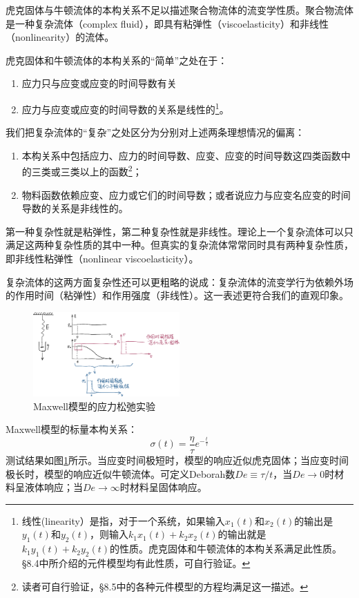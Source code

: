 \documentclass[main.tex]{subfiles}
\begin{document}
虎克固体与牛顿流体的本构关系不足以描述聚合物流体的流变学性质。聚合物流体是一种复杂流体（complex fluid），即具有粘弹性（viscoelasticity）和非线性（nonlinearity）的流体。

虎克固体和牛顿流体的本构关系的“简单”之处在于：
\begin{enumerate}
    \item 应力只与应变或应变的时间导数有关
    \item 应力与应变或应变的时间导数的关系是线性的\footnote{线性(linearity）是指，对于一个系统，如果输入\(x_1\left(t\right)\)和\(x_2\left(t\right)\)的输出是\(y_1\left(t\right)\)和\(y_2\left(t\right)\)，则输入\(k_1x_1\left(t\right)+k_2x_2\left(t\right)\)的输出就是\(k_1y_1\left(t\right)+k_2y_2\left(t\right)\)的性质。虎克固体和牛顿流体的本构关系满足此性质。\S 8.4中所介绍的元件模型均有此性质，可自行验证。}。
\end{enumerate}
我们把复杂流体的“复杂”之处区分为分别对上述两条理想情况的偏离：
\begin{enumerate}
    \item 本构关系中包括应力、应力的时间导数、应变、应变的时间导数这四类函数中的三类或三类以上的函数\footnote{读者可自行验证，\S 8.5中的各种元件模型的方程均满足这一描述。}；
    \item 物料函数依赖应变、应力或它们的时间导数；或者说应力与应变名应变的时间导数的关系是非线性的。
\end{enumerate}
第一种复杂性就是粘弹性，第二种复杂性就是非线性。理论上一个复杂流体可以只满足这两种复杂性质的其中一种。但真实的复杂流体常常同时具有两种复杂性质，即非线性粘弹性（nonlinear viscoelasticity）。

复杂流体的这两方面复杂性还可以更粗略的说成：复杂流体的流变学行为依赖外场的作用时间（粘弹性）和作用强度（非线性）。这一表述更符合我们的直观印象。

\begin{figure}[h]
\centering
\includegraphics[width=0.5\textwidth]{images/I.2.1.eps}
\caption{Maxwell模型的应力松弛实验}
\label{fig:I.2.1}
\end{figure}

\begin{example}[应力松弛实验]
Maxwell模型的标量本构关系\cite[\S8.5.1,p.~240]{何曼君2007}：
\[\sigma\left(t\right)=\frac{\eta}{\tau}e^{-\frac{t}{\tau}}\]
测试结果如图\ref{fig:I.2.1}所示。当应变时间极短时，模型的响应近似虎克固体；当应变时间极长时，模型的响应近似牛顿流体。可定义Deborah数$De\equiv\tau/t$，当$De\rightarrow0$时材料呈液体响应；当$De\rightarrow\infty$时材料呈固体响应。
\end{example}
\end{document}
